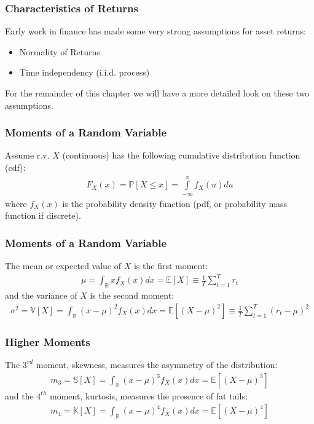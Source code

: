 \documentclass[xcolor=dvipsnames, english, 8pt]{beamer}
\begin{document}
\begin{frame}
    \frametitle{Characteristics of Returns}
    Early work in finance has made some very strong assumptions for asset returns:\vspace{0.25cm}\\
    \begin{itemize}
        \item Normality of Returns
        \item Time independency (i.i.d. process)\vspace{0.25cm}\\

    \end{itemize}
    For the remainder of this chapter we will have a more detailed look on these two assumptions.
\end{frame}

\begin{frame}
    \frametitle{Moments of a Random Variable}
    Assume r.v. $X$ (continuous) has the following cumulative distribution function (cdf):
\begin{align}
    F_X(x) = \mathbb{P}[X\leq x] = \int\limits_{-\infty}^x f_X(u)du
\end{align}
where $f_X(x)$ is the probability density function (pdf, or probability mass function if discrete).
\end{frame}

\begin{frame}
    \frametitle{Moments of a Random Variable}
 The  {\color{red}mean} or expected value of $X$ is the first moment:
\begin{align}
    \mu  = \int_{\mathbb{R}} x f_X(x)dx = \mathbb{E}[X] \equiv \frac{1}{T}\sum\limits_{t=1}^T r_t
\end{align}
and the  {\color{red}variance} of $X$ is the second moment:
\begin{align}
    \sigma^2 = \mathbb{V}[X]  = \int_{\mathbb{R}} (x-\mu)^2 f_X(x)dx = \mathbb{E}[(X- \mu)^2] \equiv \frac{1}{T}\sum\limits_{t=1}^T (r_t-\mu)^2
\end{align}
\end{frame}

\begin{frame}
    \frametitle{Higher Moments}
    The $3^{rd}$ moment, {\color{red}skewness}, measures the asymmetry of the distribution:
    \begin{align}
        m_3 = \mathbb{S}[X]  = \int_{\mathbb{R}} (x-\mu)^3 f_X(x)dx = \mathbb{E}[(X- \mu)^3]
    \end{align}
    and the $4^{th}$ moment, {\color{red}kurtosis}, measures the presence of fat tails:
    \begin{align}
        m_4 = \mathbb{K}[X]  = \int_{\mathbb{R}} (x-\mu)^4 f_X(x)dx = \mathbb{E}[(X- \mu)^4]
    \end{align}
\end{frame}
\end{document}
